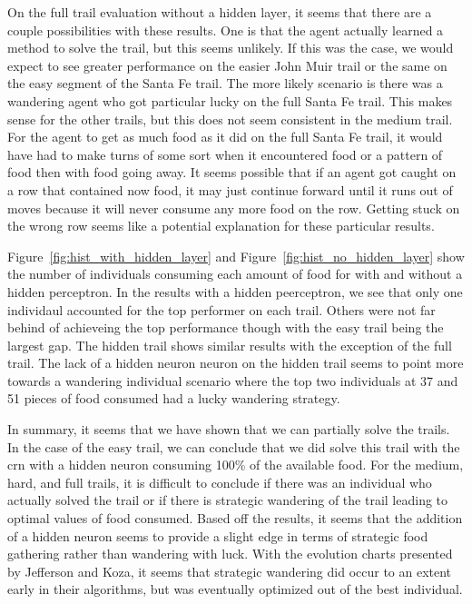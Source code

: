 On the full trail evaluation without a hidden layer, it seems that there are a couple possibilities with these results. One is that the agent actually learned a method to solve the trail, but this seems unlikely. If this was the case, we would expect to see greater performance on the easier John Muir trail or the same on the easy segment of the Santa Fe trail. The more likely scenario is there was a wandering agent who got particular lucky on the full Santa Fe trail. This makes sense for the other trails, but this does not seem consistent in the medium trail. For the agent to get as much food as it did on the full Santa Fe trail, it would have had to make turns of some sort when it encountered food or a pattern of food then with food going away. It seems possible that if an agent got caught on a row that contained now food, it may just continue forward until it runs out of moves because it will never consume any more food on the row. Getting stuck on the wrong row seems like a potential explanation for these particular results.

Figure~\ref{fig:hist_with_hidden_layer} and Figure~\ref{fig:hist_no_hidden_layer} show the number of individuals consuming each amount of food for with and without a hidden perceptron. In the results with a hidden peerceptron, we see that only one individaul accounted for the top performer on each trail. Others were not far behind of achieveing the top performance though with the easy trail being the largest gap. The hidden trail shows similar results with the exception of the full trail. The lack of a hidden neuron neuron on the hidden trail seems to point more towards a wandering individual scenario where the top two individuals at 37 and 51 pieces of food consumed had a lucky wandering strategy.

In summary, it seems that we have shown that we can partially solve the trails. In the case of the easy trail, we can conclude that we did solve this trail with the \gls{crn} with a hidden neuron consuming 100\% of the available food. For the medium, hard, and full trails, it is difficult to conclude if there was an individual who actually solved the trail or if there is strategic wandering of the trail leading to optimal values of food consumed. Based off the results, it seems that the addition of a hidden neuron seems to provide a slight edge in terms of strategic food gathering rather than wandering with luck. With the evolution charts presented by Jefferson and Koza, it seems that strategic wandering did occur to an extent early in their algorithms, but was eventually optimized out of the best individual.

